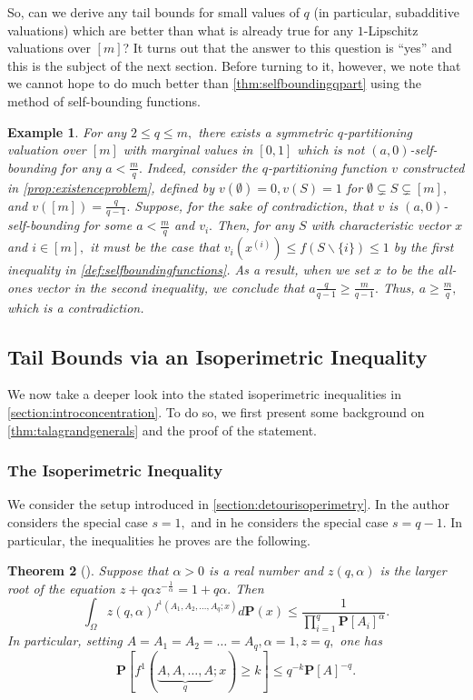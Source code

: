 \documentclass[11pt]{article}\usepackage{amsfonts}
\newtheorem{theorem}{Theorem}
\newtheorem{example}[theorem]{Example}
\numberwithin{theorem}{subsection}
\newcommand{\prob}{\mathbf{P}}
\begin{document}
\noindent
So, can we derive any tail bounds for
small values of $q$ (in particular, subadditive valuations) which are better than what is already true for any $1$-Lipschitz valuations over $[m]$? It turns out that the answer to this question is ``yes'' and this is the subject of the next section. Before turning to it, however, we note that we cannot hope to do much better than \cref{thm:selfboundingqpart}
using the method of self-bounding functions.

\begin{example}
\normalfont
For any $2\le q\le m,$ there exists a symmetric $q$-partitioning valuation over $[m]$ with marginal values in $[0,1]$ which is not $(a,0)$-self-bounding for any $a<\frac{m}{q}.$ Indeed, consider the $q$-partitioning function $v$ constructed in \cref{prop:existenceproblem}, defined by $v(\emptyset) = 0, v(S) = 1$ for $\emptyset \subsetneq S\subsetneq [m],$ and 
$v([m]) = \frac{q}{q-1}.$ Suppose, for the sake of contradiction, that $v$ is $(a,0)$-self-bounding for some $a<\frac{m}{q}$ and $v_i.$
Then, for any $S$ with characteristic vector $x$ and $i\in [m],$ it must be the case that $v_i(x^{(i)})\le f(S\backslash \{i\}) \le 1$ by the first inequality in \cref{def:selfboundingfunctions}. As a result, when we set $x$ to be the all-ones vector in the second inequality, we conclude that $a\frac{q}{q-1}\ge \frac{m}{q-1}.$ Thus, $a\ge \frac{m}{q},$ which is a contradiction.
\end{example}

\subsection{Tail Bounds via an Isoperimetric Inequality}
We now 
take a deeper look into the stated isoperimetric inequalities in \cref{section:introconcentration}. To do so, we first present some background on
\cref{thm:talagrandgenerals} and the proof of the statement. 
\subsubsection{The Isoperimetric Inequality}
We consider the setup introduced in \cref{section:detourisoperimetry}.
In \cite[Section 3.1.1]{Talagrand01} the author considers the special case $s = 1,$ and in \cite[Section 5.7]{Talagrand96} he considers the special case $s = q-1.$ In particular, the inequalities he proves are the following.

\begin{theorem}[{\cite[Section 3.2]{Talagrand01}}]
\label{thm:talagrands1} Suppose that $\alpha>0$ is a real number and $z(q,\alpha)$ is the larger root of the equation $z+q\alpha z^{-\frac{1}{\alpha}} = 1+q\alpha.$
Then
$$
\int_{\Omega}
z(q,\alpha)^{f^1(A_1, A_2, \ldots, A_q; x)}d\prob(x)\le 
\frac{1}{\prod_{i=1}^q \prob[A_i]^\alpha}.
$$
In particular, setting $A= A_1 = A_2= \ldots = A_q, \alpha = 1, z= q,$ one has
$$\prob[f^1(\underbrace{A, A, \ldots, A}_{q}; x)\ge k]\le 
q^{-k}\prob[A]^{-q}.$$
\end{theorem}
\end{document}
